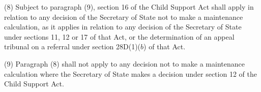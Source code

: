 \documentclass[12pt,a4paper]{article}
\begin{document}
%
%

(8) Subject to paragraph (9), section 16 of the Child Support Act shall apply in relation to any decision of the 
Secretary of State  %
not to make a maintenance calculation, as it applies in relation to any decision of the 
Secretary of State  %
under sections 11, 12 or 17 of that Act, or the determination of an appeal tribunal on a referral under section 28D(1)($b$)  of that Act.

(9) Paragraph (8) shall not apply to any decision not to make a maintenance calculation where the 
Secretary of State  %
makes a decision under section 12 of the Child Support Act.
\end{document}
